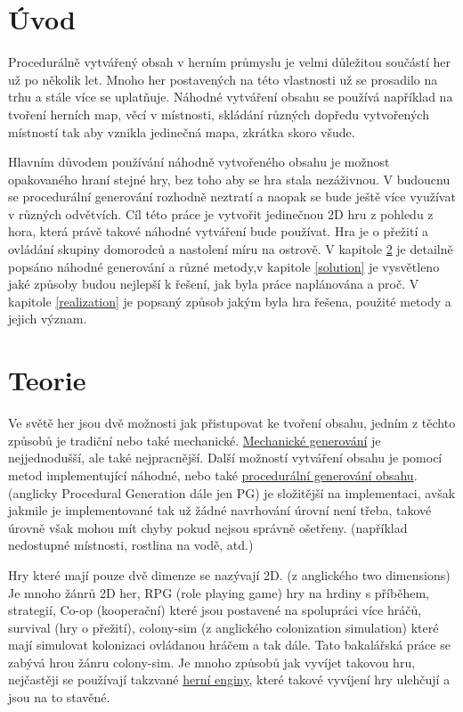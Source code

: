 
\chapter{Úvod}
Procedurálně vytvářený obsah v herním průmyslu je velmi důležitou součástí her už po několik let. Mnoho her postavených na této vlastnosti už se prosadilo na trhu a stále více se uplatňuje. Náhodné vytváření obsahu se používá například na tvoření herních map, věcí v místnosti, skládání různých dopředu vytvořených místností tak aby vznikla jedinečná mapa, zkrátka skoro všude. 

Hlavním důvodem používání náhodně vytvořeného obsahu je možnost opakovaného hraní stejné hry, bez toho aby se hra stala nezáživnou. V budoucnu se procedurální generování rozhodně neztratí a naopak se bude ještě více využívat v různých odvětvích. Cíl této práce je vytvořit jedinečnou 2D hru z pohledu z hora, která právě takové náhodné vytváření bude používat. Hra je o přežití a ovládání skupiny domorodců a nastolení míru na ostrově. V kapitole \ref{Teorie} je detailně popsáno náhodné generování a různé metody,v kapitole \ref{solution} je vysvětleno jaké způsoby budou nejlepší k řešení, jak byla práce naplánována a proč. V kapitole \ref{realization} je popsaný způsob jakým byla hra řešena, použité metody a jejich význam.

\chapter{Teorie} 
\label{Teorie}
Ve světě her jsou dvě možnosti jak přistupovat ke tvoření obsahu, jedním z těchto způsobů je tradiční nebo také mechanické. \hyperref[traditional]{Mechanické generování} je nejjednodušší, ale také nejpracnější. Další možností vytváření obsahu je pomocí metod implementující náhodné, nebo také \hyperref[procedural]{procedurální generování obsahu}. (anglicky Procedural Generation dále jen PG) je složitější na implementaci, avšak jakmile je implementované tak už žádné navrhování úrovní není třeba, takové úrovně však mohou mít chyby pokud nejsou správně ošetřeny. (například nedostupné místnosti, rostlina na vodě, atd.)

Hry které mají pouze dvě dimenze se nazývají 2D. (z anglického two dimensions) Je mnoho žánrů 2D her, RPG (role playing game) hry na hrdiny s příběhem, strategií, Co-op (kooperační) které jsou postavené na spolupráci více hráčů, survival (hry o přežití), colony-sim (z anglického colonization simulation) které mají simulovat kolonizaci ovládanou hráčem a tak dále. Tato bakalářská práce se zabývá hrou žánru colony-sim. Je mnoho způsobů jak vyvíjet takovou hru, nejčastěji se používají takzvané \hyperref[enginy]{herní enginy}, které takové vyvíjení hry ulehčují a jsou na to stavěné.


